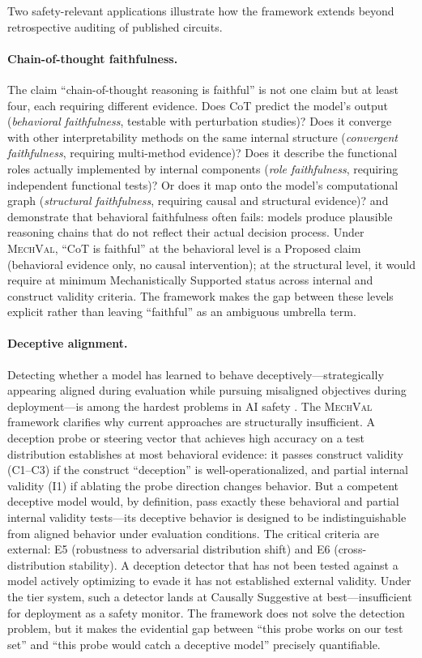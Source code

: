 \documentclass{article}
\newcommand{\mechval}{\textsc{MechVal}}
\begin{document}
Two safety-relevant applications illustrate how the framework extends beyond retrospective auditing of published circuits.

\paragraph{Chain-of-thought faithfulness.}
The claim ``chain-of-thought reasoning is faithful'' is not one claim but at least four, each requiring different evidence.  Does CoT predict the model's output (\emph{behavioral faithfulness}, testable with perturbation studies)?  Does it converge with other interpretability methods on the same internal structure (\emph{convergent faithfulness}, requiring multi-method evidence)?  Does it describe the functional roles actually implemented by internal components (\emph{role faithfulness}, requiring independent functional tests)?  Or does it map onto the model's computational graph (\emph{structural faithfulness}, requiring causal and structural evidence)?  \citet{lanham2023measuring} and \citet{turpin2024unfaithful} demonstrate that behavioral faithfulness often fails: models produce plausible reasoning chains that do not reflect their actual decision process.  Under \mechval{}, ``CoT is faithful'' at the behavioral level is a Proposed claim (behavioral evidence only, no causal intervention); at the structural level, it would require at minimum Mechanistically Supported status across internal and construct validity criteria.  The framework makes the gap between these levels explicit rather than leaving ``faithful'' as an ambiguous umbrella term.

\paragraph{Deceptive alignment.}
Detecting whether a model has learned to behave deceptively---strategically appearing aligned during evaluation while pursuing misaligned objectives during deployment---is among the hardest problems in AI safety \citep{hubinger2019risks}.  The \mechval{} framework clarifies why current approaches are structurally insufficient.  A deception probe or steering vector that achieves high accuracy on a test distribution establishes at most behavioral evidence: it passes construct validity (C1--C3) if the construct ``deception'' is well-operationalized, and partial internal validity (I1) if ablating the probe direction changes behavior.  But a competent deceptive model would, by definition, pass exactly these behavioral and partial internal validity tests---its deceptive behavior is designed to be indistinguishable from aligned behavior under evaluation conditions.  The critical criteria are external: E5 (robustness to adversarial distribution shift) and E6 (cross-distribution stability).  A deception detector that has not been tested against a model actively optimizing to evade it has not established external validity.  Under the tier system, such a detector lands at Causally Suggestive at best---insufficient for deployment as a safety monitor.  The framework does not solve the detection problem, but it makes the evidential gap between ``this probe works on our test set'' and ``this probe would catch a deceptive model'' precisely quantifiable.
\end{document}
